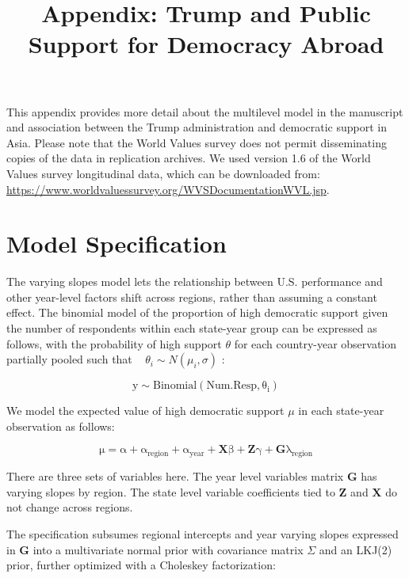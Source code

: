 \documentclass[12pt]{article}
\title{\textbf{Appendix: Trump and Public Support for Democracy Abroad}}
\date{}
\begin{document}
\maketitle 

\singlespace 

This appendix provides more detail about the multilevel model in the manuscript and association between the Trump administration and democratic support in Asia. 
Please note that the World Values survey does not permit disseminating copies of the data in replication archives. 
We used version 1.6 of the World Values survey longitudinal data, which can be downloaded from: \url{https://www.worldvaluessurvey.org/WVSDocumentationWVL.jsp}.



\section{Model Specification} 



The varying slopes model lets the relationship between U.S. performance and other year-level factors shift across regions, rather than assuming a constant effect. 
The binomial model of the proportion of high democratic support given the number of respondents within each state-year group can be expressed as follows, with the probability of high support $\theta$ for each country-year observation partially pooled such that ~ $\theta_i \sim N(\mu_i, \sigma)$ : 


\begin{equation}
\mathrm{ y \sim Binomial(Num. Resp, \theta_i)}
\end{equation} 

We model the expected value of high democratic support $\mu$ in each state-year observation as follows:

\begin{equation}
\mathrm{ \mu = \alpha + \alpha_{region} + \alpha_{year} + \textbf{X} \beta + \textbf{Z} \gamma +  \textbf{G} \lambda_{region}} 
\end{equation} 

There are three sets of variables here. 
The year level variables matrix $\textbf{G}$ has varying slopes by region.
The state level variable coefficients tied to $\textbf{Z}$ and $\textbf{X}$ do not change across regions. 


The specification subsumes regional intercepts and year varying slopes expressed in $\textbf{G}$ into a multivariate normal prior with covariance matrix $\Sigma$ and an LKJ(2) prior, further optimized with a Choleskey factorization: 
\end{document}
